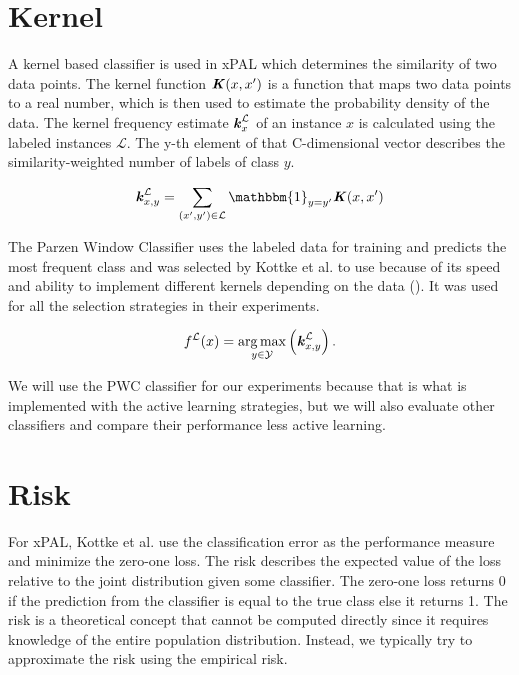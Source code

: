 \section{Kernel}

A kernel based classifier is used in xPAL which determines the similarity of two data points. The kernel function $\textbf{\textit{K}}(x,x')$ is a function that maps two data points to a real number, which is then used to estimate the probability density of the data. The kernel frequency estimate $\textbf{\textit{k}}^{\mathcal{L}}_x$ of an instance $x$ is calculated using the labeled instances $\mathcal{L}$. The y-th element of that C-dimensional vector describes the similarity-weighted number of labels of class $y$.

\begin{equation}
\textbf{\textit{k}}^{\mathcal{L}}_{x,y} = \sum_{(x',y') \in \mathcal{L}} \mathbbm{1}_{y=y'} \textbf{\textit{K}}(x,x')
\label{eq:kernel}
\end{equation}

The Parzen Window Classifier uses the labeled data for training and predicts the most frequent class and was selected by Kottke et al. to use because of its speed and ability to implement different kernels depending on the data (\cite{kottke2021toward}). It was used for all the selection strategies in their experiments. 

\begin{equation}
f^{\mathcal{L}}(x) = \underset{y \in \mathcal{Y}}{\arg \max} \left( \textbf{\textit{k}}^{\mathcal{L}}_{x,y} \right)\hbox{.}
\end{equation}

We will use the PWC classifier for our experiments because that is what is implemented with the active learning strategies, but we will also evaluate other classifiers and compare their performance less active learning.

\section{Risk}

For xPAL, Kottke et al. use the classification error as the performance measure and minimize the zero-one loss. The risk describes the expected value of the loss relative to the joint distribution given some classifier. The zero-one loss returns 0 if the prediction from the classifier is equal to the true class else it returns 1. The risk is a theoretical concept that cannot be computed directly since it requires knowledge of the entire population distribution. Instead, we typically try to approximate the risk using the empirical risk.

